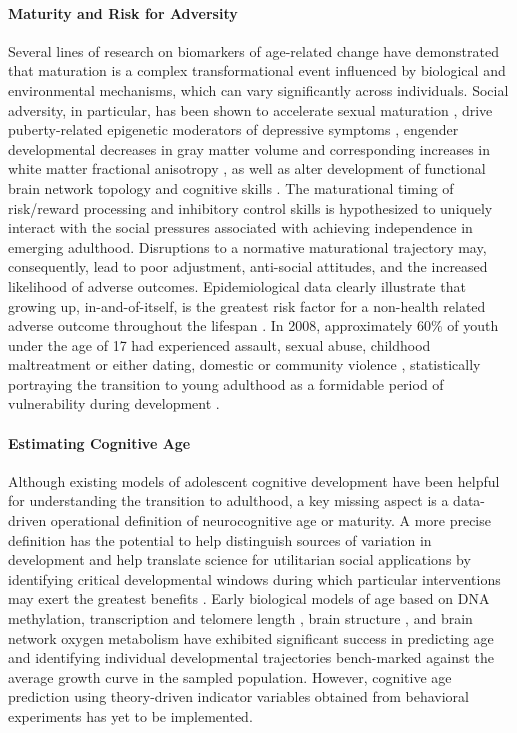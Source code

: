 \documentclass[utf8]{frontiersSCNS} %
\begin{document}
\paragraph{Maturity and Risk for Adversity}
Several lines of research on biomarkers of age-related change have demonstrated that maturation is a complex transformational event influenced by biological and environmental mechanisms, which can vary significantly across individuals. Social adversity, in particular, has been shown to accelerate sexual maturation \citep{rickard2014childhood}, drive puberty-related epigenetic moderators of depressive symptoms \citep{sumner2019early}, engender developmental decreases in gray matter volume and corresponding increases in white matter fractional anisotropy \citep{gur2019burden, Gogtay2004}, as well as alter development of functional brain network topology \citep{tooley2020associations} and cognitive skills \citep{mclaughlin2019childhood, belsky2019early}. The maturational timing of risk/reward processing and inhibitory control skills is hypothesized to uniquely interact with the social pressures associated with achieving independence in emerging adulthood. Disruptions to a normative maturational trajectory may, consequently, lead to poor adjustment, anti-social attitudes, and the increased likelihood of adverse outcomes. Epidemiological data clearly illustrate that growing up, in-and-of-itself, is the greatest risk factor for a non-health related adverse outcome throughout the lifespan \citep{turner2006effect}. In 2008, approximately 60\% of youth under the age of 17 had experienced assault, sexual abuse, childhood maltreatment or either dating, domestic or community violence \citep{finkelhor2009children}, statistically portraying the transition to young adulthood as a formidable period of vulnerability during development \citep*{berzin2010vulnerability}.
%
\paragraph{Estimating Cognitive Age}
Although existing models of adolescent cognitive development have been helpful for understanding the transition to adulthood, a key missing aspect is a data-driven operational definition of neurocognitive age or maturity. A more precise definition has the potential to help distinguish sources of variation in development and help translate science for utilitarian social applications by identifying critical developmental windows during which particular interventions may exert the greatest benefits \citep{somerville2016searching}. Early biological models of age based on DNA methylation, transcription and telomere length \citep{baker1988biomarkers, jylhava2017biological}, brain structure \citep{khundrakpam2015prediction,aycheh2018biological,madan2018predicting}, and brain network oxygen metabolism \citep{dosenbach2010prediction, qin2015predicting} have exhibited significant success in predicting age and identifying individual developmental trajectories bench-marked against the average growth curve in the sampled population. However, cognitive age prediction using theory-driven indicator variables obtained from behavioral experiments has yet to be implemented. 
%
\end{document}

